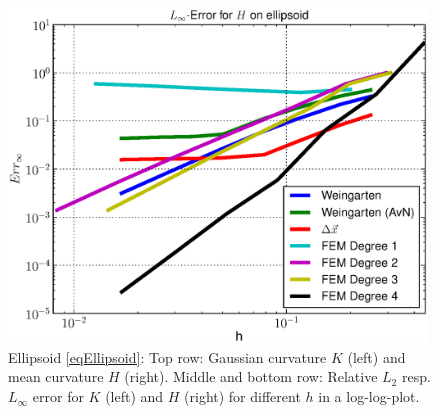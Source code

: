 \begin{figure}
\begin{minipage}[htp]{.23\textwidth}
      \centering
      \includegraphics[width=0.99\textwidth]{bilder/ellipsoid/LMaxH.eps}
    \end{minipage}
    \caption{Ellipsoid \eqref{eqEllipsoid}: Top row: Gaussian curvature \( K \) (left) and mean curvature \( H \) (right).
                              Middle and bottom row: Relative \( L_{2} \) resp. \( L_{\infty} \) error for \( K \) (left) and
                                                     \( H \) (right) for different \( h \) in a log-log-plot.}
    \label{figEllipsoid}
  \end{figure}

